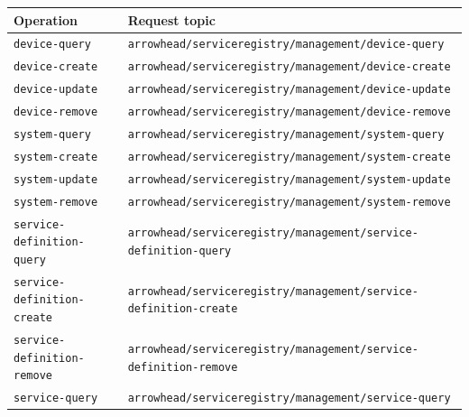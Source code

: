 \documentclass[a4paper]{arrowhead}
\begin{document}
\noindent\begin{longtable}{| p{5cm} | p{10.4cm} |} \hline
\rowcolor{gray!33} Operation & Request topic \\ \hline \endhead
\texttt{device-\allowbreak{}query} & \texttt{arrowhead/\allowbreak{}serviceregistry/\allowbreak{}management/\allowbreak{}device-\allowbreak{}query} \\ \hline
\texttt{device-\allowbreak{}create} & \texttt{arrowhead/\allowbreak{}serviceregistry/\allowbreak{}management/\allowbreak{}device-\allowbreak{}create} \\ \hline
\texttt{device-\allowbreak{}update} & \texttt{arrowhead/\allowbreak{}serviceregistry/\allowbreak{}management/\allowbreak{}device-\allowbreak{}update} \\ \hline
\texttt{device-\allowbreak{}remove} & \texttt{arrowhead/\allowbreak{}serviceregistry/\allowbreak{}management/\allowbreak{}device-\allowbreak{}remove} \\ \hline
\texttt{system-\allowbreak{}query} & \texttt{arrowhead/\allowbreak{}serviceregistry/\allowbreak{}management/\allowbreak{}system-\allowbreak{}query} \\ \hline
\texttt{system-\allowbreak{}create} & \texttt{arrowhead/\allowbreak{}serviceregistry/\allowbreak{}management/\allowbreak{}system-\allowbreak{}create} \\ \hline
\texttt{system-\allowbreak{}update} & \texttt{arrowhead/\allowbreak{}serviceregistry/\allowbreak{}management/\allowbreak{}system-\allowbreak{}update} \\ \hline
\texttt{system-\allowbreak{}remove} & \texttt{arrowhead/\allowbreak{}serviceregistry/\allowbreak{}management/\allowbreak{}system-\allowbreak{}remove} \\ \hline
\texttt{service-\allowbreak{}definition-\allowbreak{}query} & \texttt{arrowhead/\allowbreak{}serviceregistry/\allowbreak{}management/\allowbreak{}service-\allowbreak{}definition-\allowbreak{}query} \\ \hline
\texttt{service-\allowbreak{}definition-\allowbreak{}create} & \texttt{arrowhead/\allowbreak{}serviceregistry/\allowbreak{}management/\allowbreak{}service-\allowbreak{}definition-\allowbreak{}create} \\ \hline
\texttt{service-\allowbreak{}definition-\allowbreak{}remove} & \texttt{arrowhead/\allowbreak{}serviceregistry/\allowbreak{}management/\allowbreak{}service-\allowbreak{}definition-\allowbreak{}remove} \\ \hline
\texttt{service-\allowbreak{}query} & \texttt{arrowhead/\allowbreak{}serviceregistry/\allowbreak{}management/\allowbreak{}service-\allowbreak{}query} \\ \hline

\end{longtable}
\end{document}
